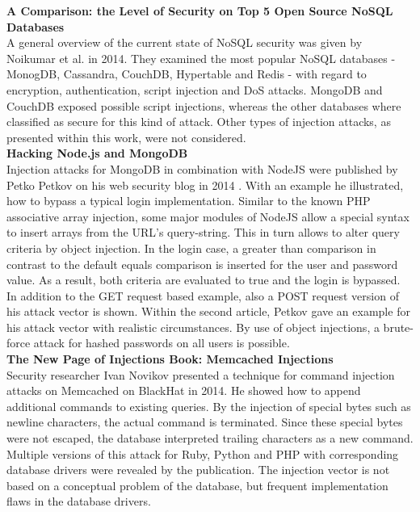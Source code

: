 \textbf{A Comparison: the Level of Security on Top 5 Open Source NoSQL Databases} \cite{Noiumkar:2014} \\
A general overview of the current state of NoSQL security was given by Noikumar et al. in 2014. They examined the most popular NoSQL databases - MonogDB, Cassandra, CouchDB, Hypertable and Redis - with regard to encryption, authentication, script injection and DoS attacks. MongoDB and CouchDB exposed possible script injections, whereas the other databases where classified as secure for this kind of attack. Other types of injection attacks, as presented within this work, were not considered. \\

\textbf{Hacking Node.js and MongoDB}\cite{Petkov:2014a, Petkov:2014b} \\
Injection attacks for MongoDB in combination with NodeJS were published by Petko Petkov on his web security blog in 2014 \cite{Petkov:2014a, Petkov:2014b}. With an example he illustrated, how to bypass a typical login implementation. Similar to the known PHP associative array injection, some major modules of NodeJS allow a special syntax to insert arrays from the URL's query-string. This in turn allows to alter query criteria by object injection. In the login case, a greater than comparison in contrast to the default equals comparison is inserted for the user and password value. As a result, both criteria are evaluated to true and the login is bypassed. In addition to the GET request based example, also a POST request version of his attack vector is shown. Within the second article, Petkov gave an example for his attack vector with realistic circumstances. By use of object injections, a brute-force attack for hashed passwords on all users is possible.\\

\textbf{The New Page of Injections Book: Memcached Injections} \cite{Novikov:2014} \\
Security researcher Ivan Novikov presented a technique for command injection attacks on Memcached on BlackHat in 2014. He showed how to append additional commands to existing queries. By the injection of special bytes such as newline characters, the actual command is terminated. Since these special bytes were not escaped, the database interpreted trailing characters as a new command. Multiple versions of this attack for Ruby, Python and PHP with corresponding database drivers were revealed by the publication. The injection vector is not based on a conceptual problem of the database, but frequent implementation flaws in the database drivers. \\


